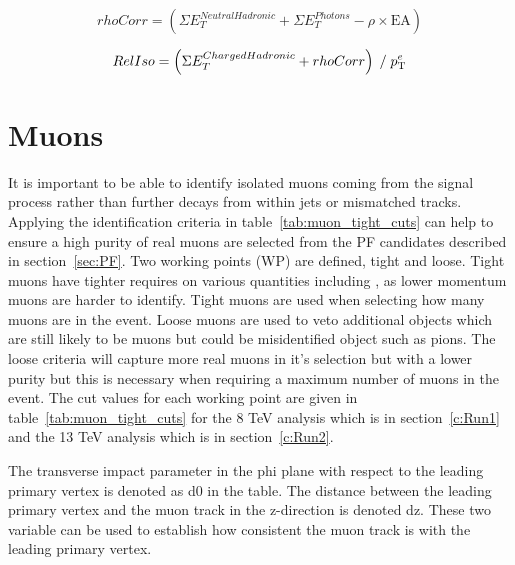 \begin{centering}
\begin{equation}
rhoCorr = \left( \Sigma E_{T}^{Neutral Hadronic} + \Sigma E_{T}^{Photons} - \rho\times\textrm{EA} \right) 
\label{eqn:rhoCorr}
\end{equation}
\end{centering}


\begin{centering}
\begin{equation}
RelIso = \left( \Sigma E_{T}^{Charged Hadronic} + rhoCorr \right) \; / \;   p_{\mathrm{T}}^{e}
\label{eqn:eRelIso}
\end{equation}
\end{centering}

\section{Muons \label{sec:muonreco}}

It is important to be able to identify isolated muons coming from the signal process rather than further decays from within jets or mismatched tracks. Applying the identification criteria in table~\ref{tab:muon_tight_cuts} can help to ensure a high purity of real muons are selected from the PF candidates described in section~\ref{sec:PF}. Two working points (WP) are defined, tight and loose. Tight muons have tighter requires on various quantities including \pt, as lower momentum muons are harder to identify. Tight muons are used when selecting how many muons are in the event. Loose muons are used to veto additional objects which are still likely to be muons but could be misidentified object such as pions. The loose criteria will capture more real muons in it's selection but with a lower purity but this is necessary when requiring a maximum number of muons in the event. The cut values for each working point are given in table~\ref{tab:muon_tight_cuts} for the 8 TeV analysis which is in section~\ref{c:Run1} and the 13 TeV analysis which is in section~\ref{c:Run2}.

The transverse impact parameter in the phi plane with respect to the leading primary vertex is denoted as d0 in the table. The distance between the leading primary vertex and the muon track in the z-direction is denoted dz. These two variable can be used to establish how consistent the muon track is with the leading primary vertex.


